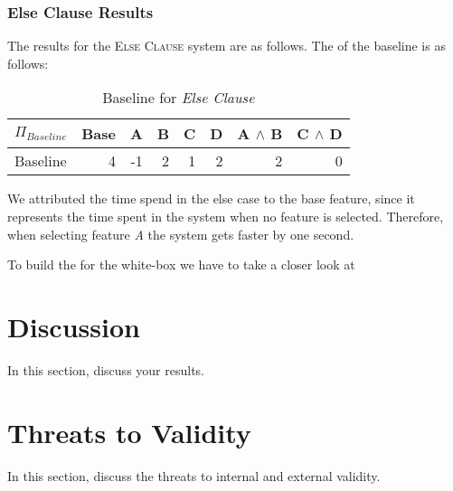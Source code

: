 \subsubsection*{Else Clause Results}

The results for the \textsc{Else Clause} system are as follows. The \perfInfluenceModel of the baseline is as follows:

\begin{table}[H]
    \centering
    \begin{tabular}{lrrrrrrr}
    \toprule
    $\Pi_{Baseline}$    & Base & A & B & C & D & A $\land$ B & C $\land$ D  \\
    \midrule
    Baseline &   4 &  -1 &  2 &  1 &  2 &   2 &  0 \\
    \bottomrule
    \end{tabular}
    \caption{Baseline {\perfInfluenceModel} for \emph{Else Clause}}
\end{table}

We attributed the time spend in the else case to the base feature, since it represents the time spent in the system when no feature is selected.
Therefore, when selecting feature \emph{A} the system gets faster by one second. 

\begin{table}[H]
    \centering
    
\end{table}


To build the {\perfInfluenceModel} for the white-box we have to take a closer look at 


\section{Discussion}\label{sec:discussion}

In this section, discuss your results.

\section{Threats to Validity}\label{sec:threats}

In this section, discuss the threats to internal and external validity.
